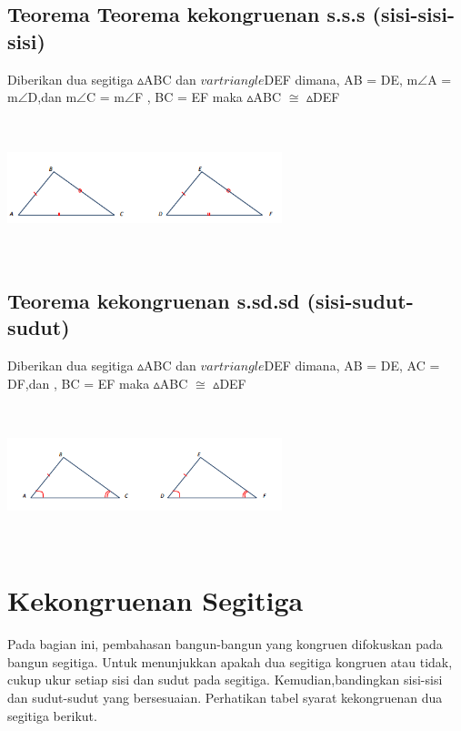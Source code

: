 \documentclass[11pt,fleqn]{book} %
\begin{document}

\subsection{Teorema Teorema kekongruenan s.s.s (sisi-sisi-sisi)}
\begin{theorem}
Diberikan dua segitiga $\vartriangle $ABC dan $vartriangle $DEF dimana, AB = DE,  m$\angle$A = m$\angle$D,dan  m$\angle$C = m$\angle$F , BC = EF  maka $\vartriangle $ABC $\cong$ $\vartriangle $DEF
\end{theorem}
\includegraphics[width = 8cm, height= 4cm]{Pictures/6.png}

\subsection{Teorema kekongruenan s.sd.sd (sisi-sudut-sudut)}
\begin{theorem}
Diberikan dua segitiga $\vartriangle $ABC dan $vartriangle $DEF dimana, AB = DE, AC = DF,dan , BC = EF  maka $\vartriangle $ABC $\cong$ $\vartriangle $DEF
\end{theorem}
\includegraphics[width = 8cm, height= 4cm]{Pictures/7.png}

\section{Kekongruenan Segitiga}

Pada bagian ini, pembahasan bangun-bangun yang kongruen difokuskan pada bangun segitiga. Untuk menunjukkan apakah dua segitiga kongruen atau tidak, cukup ukur setiap sisi dan sudut pada segitiga. Kemudian,bandingkan sisi-sisi dan sudut-sudut yang bersesuaian. Perhatikan tabel syarat kekongruenan dua segitiga berikut.
\end{document}
